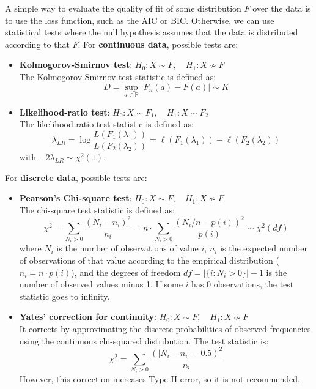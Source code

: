 A simple way to evaluate the quality of fit of some distribution $F$ over the data is to use the loss function, such as the AIC or BIC. Otherwise, we can use statistical tests where the null hypothesis assumes that the data is distributed according to that $F$. For \textbf{continuous data}, possible tests are:
\begin{itemize}
    \item \textbf{Kolmogorov-Smirnov test}: $H_0 : X \sim F, \quad H_1 : X \not \sim F$ \\
    The Kolmogorov-Smirnov test statistic is defined as:
    \begin{equation*}
        D = \sup_{a \in \mathbb{R}} |F_n(a) - F(a)| \sim K
    \end{equation*}
    \item \textbf{Likelihood-ratio test}: $H_0 : X \sim F_1, \quad H_1 : X \sim F_2$ \\
    The likelihood-ratio test statistic is defined as:
    \begin{equation*}
        \lambda_{LR} = \log \frac{L(F_1(\lambda_1))}{L(F_2(\lambda_2))} = \ell (F_1(\lambda_1)) - \ell(F_2(\lambda_2))
    \end{equation*}
    with $-2\lambda_{LR} \sim \chi^2(1)$.
\end{itemize}
For \textbf{discrete data}, possible tests are:
\begin{itemize}
    \item \textbf{Pearson's Chi-square test}: $H_0 : X \sim F, \quad H_1 : X \not \sim F$ \\
    The chi-square test statistic is defined as:
    \begin{equation*}
        \chi^2 = \sum_{N_i > 0} \frac{(N_i - n_i)^2}{n_i} = n \cdot \sum_{N_i > 0} \frac{(N_i/n - p(i))^2}{p(i)} \sim \chi^2(\textit{df})
    \end{equation*}
    where $N_i$ is the number of observations of value $i$, $n_i$ is the expected number of observations of that value according to the empirical distribution ($n_i = n \cdot p(i)$), and the degrees of freedom $\textit{df} = |\{i : N_i > 0\}| - 1$ is the number of observed values minus 1. If some $i$ has 0 observations, the test statistic goes to infinity.
    \item \textbf{Yates' correction for continuity}: $H_0 : X \sim F, \quad H_1 : X \not \sim F$ \\
    It corrects by approximating the discrete probabilities of observed frequencies using the continuous chi-squared distribution. The test statistic is:
    \begin{equation*}
        \chi^2 = \sum_{N_i > 0} \frac{(|N_i - n_i| - 0.5)^2}{n_i}
    \end{equation*}
    However, this correction increases Type II error, so it is not recommended.
\end{itemize}

